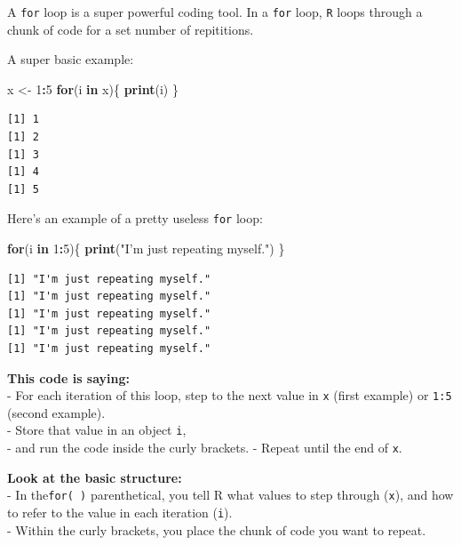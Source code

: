 \documentclass[
]{book}
\newenvironment{Shaded}{\begin{snugshade}}{\end{snugshade}}
\newcommand{\ControlFlowTok}[1]{\textcolor[rgb]{0.13,0.29,0.53}{\textbf{#1}}}
\newcommand{\DecValTok}[1]{\textcolor[rgb]{0.00,0.00,0.81}{#1}}
\newcommand{\KeywordTok}[1]{\textcolor[rgb]{0.13,0.29,0.53}{\textbf{#1}}}
\newcommand{\NormalTok}[1]{#1}
\newcommand{\OperatorTok}[1]{\textcolor[rgb]{0.81,0.36,0.00}{\textbf{#1}}}
\newcommand{\StringTok}[1]{\textcolor[rgb]{0.31,0.60,0.02}{#1}}
\begin{document}
A \texttt{for} loop is a super powerful coding tool. In a \texttt{for} loop, \texttt{R} loops through a chunk of code for a set number of repititions.

A super basic example:

\begin{Shaded}
\begin{Highlighting}[]
\NormalTok{x <-}\StringTok{ }\DecValTok{1}\OperatorTok{:}\DecValTok{5}
\ControlFlowTok{for}\NormalTok{(i }\ControlFlowTok{in}\NormalTok{ x)\{}
  \KeywordTok{print}\NormalTok{(i)}
\NormalTok{\}}
\end{Highlighting}
\end{Shaded}

\begin{verbatim}
[1] 1
[1] 2
[1] 3
[1] 4
[1] 5
\end{verbatim}

Here's an example of a pretty useless \texttt{for} loop:

\begin{Shaded}
\begin{Highlighting}[]
\ControlFlowTok{for}\NormalTok{(i }\ControlFlowTok{in} \DecValTok{1}\OperatorTok{:}\DecValTok{5}\NormalTok{)\{}
  \KeywordTok{print}\NormalTok{(}\StringTok{"I'm just repeating myself."}\NormalTok{)}
\NormalTok{\}}
\end{Highlighting}
\end{Shaded}

\begin{verbatim}
[1] "I'm just repeating myself."
[1] "I'm just repeating myself."
[1] "I'm just repeating myself."
[1] "I'm just repeating myself."
[1] "I'm just repeating myself."
\end{verbatim}

\textbf{This code is saying:}\\
- For each iteration of this loop, step to the next value in \texttt{x} (first example) or \texttt{1:5} (second example).\\
- Store that value in an object \texttt{i},\\
- and run the code inside the curly brackets.
- Repeat until the end of \texttt{x}.

\textbf{Look at the basic structure:}\\
- In the\texttt{for(\ )} parenthetical, you tell R what values to step through (\texttt{x}), and how to refer to the value in each iteration (\texttt{i}).\\
- Within the curly brackets, you place the chunk of code you want to repeat.
\end{document}

